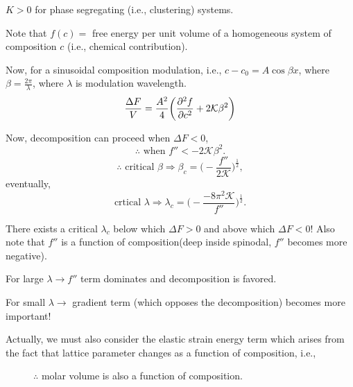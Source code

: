 \documentclass[12pt]{article}
\newcommand{\tikzmark}[1]{\tikz[overlay,remember picture] \node (#1) {};}
\begin{document}
$K > 0$ for phase segregating (i.e., clustering) systems.

Note that $f(c) =$ free energy per unit volume
of a homogeneous system of composition $c$ (i.e., chemical
contribution).

Now, for a sinusoidal composition modulation,
i.e., $c - c_0 = A \cos \beta x$, where $\beta = \frac{ 2\pi }{ \lambda }$,
where $\lambda$ is modulation wavelength.
\begin{equation*}
 \frac{ \Delta F }{ V } = \frac{ A^2 }{ 4 } \bigg(
 \tikzmark{f''}
 \frac{ \partial^2 f }{ \partial c^2 } +
 \tikzmark{Kb}
 2 \mathcal{K} \beta^2
 \bigg)
\end{equation*}
\begin{figure}[h]
\end{figure}

Now, decomposition can proceed when $\Delta F < 0$,
\begin{equation*}
 \therefore {\text{ when }} f'' < - 2 \mathcal{K} \beta^2.
\end{equation*}
\begin{equation*}
 \therefore {\text{ critical }} \beta \Rightarrow \beta_c =
 \bigg( -\frac{ f'' }{ 2\mathcal{K} } \bigg)^{\frac{ 1 }{ 2 }},
\end{equation*}
eventually,
\begin{equation*}
 {\text{crtical }} \lambda \Rightarrow \lambda_c =
 \bigg( -\frac{ -8\pi^2\mathcal{K} }{ f'' } \bigg)^{\frac{ 1 }{ 2 }}.
\end{equation*}

There exists a critical $\lambda_c$ below which $\Delta F > 0$ and
above which $\Delta F < 0$!
Also note that $f''$ is a function of composition(deep inside spinodal,
$f''$ becomes more negative).

For large $\lambda \rightarrow f''$ term dominates and decomposition
is favored.

For small $\lambda \rightarrow$ gradient term (which opposes the
decomposition) becomes more important!

Actually, we must also consider the elastic strain energy term which arises
from the fact that lattice parameter changes as a function of composition,
i.e.,
\begin{figure}[h]
 \begin{minipage}[l]{0.5\textwidth}
  
 \end{minipage}%
 \hfill
 \begin{minipage}[r]{0.4\textwidth}
  $\therefore$ molar volume is also a function of composition.
 \end{minipage}
\end{figure}
\end{document}
